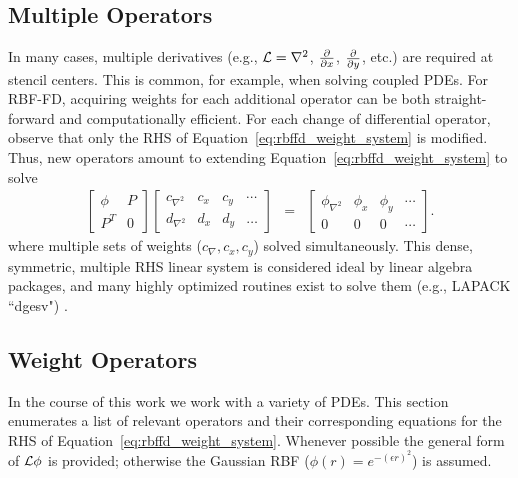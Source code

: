 \documentclass[11pt]{report}
\begin{document}
{%



\subsection{Multiple Operators}

In many cases, multiple derivatives (e.g., $\mathcal{L} = \nabla^2$, $\frac{\partial }{\partial x}$, $\frac{\partial }{\partial y}$, etc.) are required at stencil centers. This is common, for example, when solving coupled PDEs. For RBF-FD, acquiring weights for each additional operator can be both straight-forward and computationally efficient. For each change of differential operator, observe that only the RHS of Equation~\ref{eq:rbffd_weight_system} is modified. Thus, new operators amount to extending Equation~\ref{eq:rbffd_weight_system} to solve 
\begin{eqnarray}
    \begin{bmatrix} \phi & P \\
		P^T & 0 \end{bmatrix} \begin{bmatrix} c_{\nabla^2} & c_{x} & c_{y} & \cdots \\ 
							d_{\nabla^2} & d_{x} & d_{y} & \dots \end{bmatrix} & = &     
		\begin{bmatrix} \phi_{\nabla^2} & \phi_{x} & \phi_{y} & \cdots \\
							0 & 0 & 0 & \cdots \end{bmatrix}. \nonumber
	\end{eqnarray}
where multiple sets of weights ($c_\nabla, c_x, c_y$) solved simultaneously. This dense, symmetric, multiple RHS linear system is considered ideal by linear algebra packages, and many highly optimized routines exist to solve them (e.g., LAPACK ``dgesv") \cite{Lapack1999}. 



\subsection{Weight Operators}
\label{sec:weight_operators}
In the course of this work we work with a variety of PDEs. This section enumerates a list of relevant operators and their corresponding equations for the RHS of Equation~\ref{eq:rbffd_weight_system}. Whenever possible the general form of $\mathcal{L}\phi$ is provided; otherwise the Gaussian RBF ($\phi(r) = e^{-(\epsilon r)^2}$) is assumed. 

}
\end{document}
